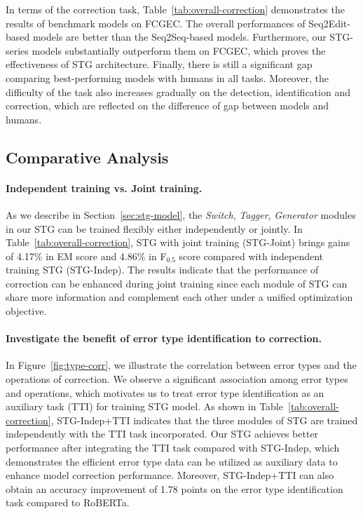 \documentclass[11pt]{article}
\begin{document}
In terms of the correction task, Table~\ref{tab:overall-correction} demonstrates the results of benchmark models on FCGEC. The overall performances of Seq2Edit-based models are better than the Seq2Seq-based models. Furthermore, our STG-series models substantially outperform them on FCGEC, which proves the effectiveness of STG architecture. Finally, there is still a significant gap comparing best-performing models with humans in all tasks. Moreover, the difficulty of the task also increases gradually on the detection, identification and correction, which are reflected on the difference of gap between models and humans.



\subsection{Comparative Analysis}

\paragraph{Independent training vs. Joint training.} As we describe in Section~\ref{sec:stg-model}, the \emph{Switch}, \emph{Tagger}, \emph{Generator} modules in our STG can be trained flexibly either independently or jointly. In Table~\ref{tab:overall-correction}, STG with joint training (STG-Joint) brings gains of 4.17\% in EM score and 4.86\% in F$_{0.5}$ score compared with independent training STG (STG-Indep). The results indicate that the performance of correction can be enhanced during joint training since each module of STG can share more information and complement each other under a unified optimization objective. 

\paragraph{Investigate the benefit of error type identification to correction.} In Figure~\ref{fig:type-corr}, we illustrate the correlation between error types and the operations of correction. We observe a significant association among error types and operations, which motivates us to treat error type identification as an auxiliary task (TTI) for training STG model. As shown in Table~\ref{tab:overall-correction}, STG-Indep+TTI indicates that the three modules of STG are trained independently with the TTI task incorporated. Our STG achieves better performance after integrating the TTI task compared with STG-Indep, which demonstrates the efficient error type data can be utilized as auxiliary data to enhance model correction performance. Moreover, STG-Indep+TTI can also obtain an accuracy improvement of 1.78 points on the error type identification task compared to RoBERTa.
\end{document}
